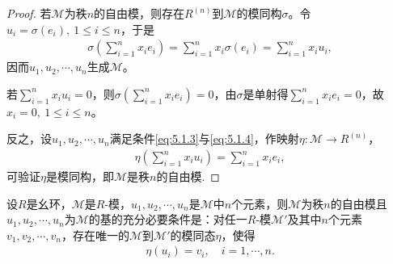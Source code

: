\documentclass[../../main.tex]{subfiles}%
\begin{document}
\begin{proof}

若$\mathscr{M}$为秩$n$的自由模，则存在$R^{(n)}$到$\mathscr{M}$的模同构$\sigma$。令$u_i=\sigma(e_i),\ 1\leqslant i\leqslant n$，于是
\begin{align*}
\sigma\left(\sum\limits_{i=1}^n x_i e_i\right)=\sum\limits_{i=1}^n x_i \sigma(e_i)=\sum\limits_{i=1}^n x_i u_i,
\end{align*}
因而$u_1,u_2,\cdots,u_n$生成$\mathscr{M}$。

若$\sum\limits_{i=1}^n x_i u_i=0$，则$\sigma\left(\sum\limits_{i=1}^n x_i e_i\right)=0$，由$\sigma$是单射得$\sum\limits_{i=1}^n x_i e_i=0$，故$x_i=0,\ 1\leqslant i\leqslant n$。

反之，设$u_1,u_2,\cdots,u_n$满足条件\eqref{eq:5.1.3}与\eqref{eq:5.1.4}，作映射$\eta:\mathscr{M}\to R^{(n)}$，
\begin{align*}
\eta\left(\sum\limits_{i=1}^n x_i u_i\right)=\sum\limits_{i=1}^n x_i e_i,
\end{align*}
可验证$\eta$是模同构，即$\mathscr{M}$是秩$n$的自由模.

\end{proof}

\begin{theorem}
设$R$是幺环，$\mathscr{M}$是$R$-模，$u_1,u_2,\cdots,u_n$是$\mathscr{M}$中$n$个元素，则$\mathscr{M}$为秩$n$的自由模且$u_1,u_2,\cdots,u_n$为$\mathscr{M}$的基的充分必要条件是：对任一$R$-模$\mathscr{M}'$及其中$n$个元素$v_1,v_2,\cdots,v_n$，存在唯一的$\mathscr{M}$到$\mathscr{M}'$的模同态$\eta$，使得
\begin{align*}
\eta(u_i)=v_i,\quad i=1,\cdots,n.
\end{align*}
\end{theorem}
\end{document}
